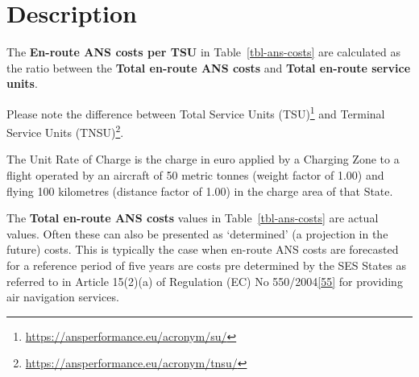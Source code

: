 \documentclass[
  11pt,
  a4paper,
]{book}
\DeclareRobustCommand{\href}[2]{#2\footnote{\url{#1}}}
\begin{document}
\hypertarget{description-10}{%
\section{Description}\label{description-10}}

The \textbf{En-route ANS costs per TSU} in Table~\ref{tbl-ans-costs} are
calculated as the ratio between the \textbf{Total en-route ANS costs}
and \textbf{Total en-route service units}.

\begin{tcolorbox}[enhanced jigsaw, opacityback=0, arc=.35mm, colframe=quarto-callout-note-color-frame, breakable, left=2mm, leftrule=.75mm, titlerule=0mm, colbacktitle=quarto-callout-note-color!10!white, rightrule=.15mm, opacitybacktitle=0.6, bottomtitle=1mm, colback=white, toptitle=1mm, title=\textcolor{quarto-callout-note-color}{\faInfo}\hspace{0.5em}{Note}, bottomrule=.15mm, toprule=.15mm, coltitle=black]

Please note the difference between
\href{https://ansperformance.eu/acronym/su/}{Total Service Units (TSU)}
and \href{https://ansperformance.eu/acronym/tnsu/}{Terminal Service
Units (TNSU)}.

\end{tcolorbox}

\begin{tcolorbox}[enhanced jigsaw, opacityback=0, arc=.35mm, colframe=quarto-callout-note-color-frame, breakable, left=2mm, leftrule=.75mm, titlerule=0mm, colbacktitle=quarto-callout-note-color!10!white, rightrule=.15mm, opacitybacktitle=0.6, bottomtitle=1mm, colback=white, toptitle=1mm, title=\textcolor{quarto-callout-note-color}{\faInfo}\hspace{0.5em}{Note}, bottomrule=.15mm, toprule=.15mm, coltitle=black]

The Unit Rate of Charge is the charge in euro applied by a Charging Zone
to a flight operated by an aircraft of 50 metric tonnes (weight factor
of 1.00) and flying 100 kilometres (distance factor of 1.00) in the
charge area of that State.

\end{tcolorbox}

The \textbf{Total en-route ANS costs} values in
Table~\ref{tbl-ans-costs} are actual values. Often these can also be
presented as `determined' (a projection in the future) costs. This is
typically the case when en-route ANS costs are forecasted for a
reference period of five years are costs pre determined by the SES
States as referred to in Article 15(2)(a) of Regulation (EC) No
550/2004\protect\hyperlink{ref-eureg:5502004}{{[}55{]}} for providing
air navigation services.
\end{document}
